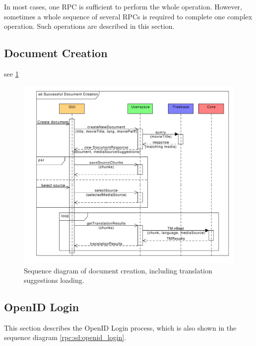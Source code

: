 In most cases, one RPC is sufficient to perform the whole operation. However, sometimes a whole sequence of several RPCs is required to complete one complex operation. Such operations are described in this section.

\subsection{Document Creation}

see \ref{rpc:sd:document_creation}



\begin{figure}[h]
\begin{center}
\includegraphics[scale=0.65]{figures/document_creation_sequence_RPC.pdf}
\end{center}
\caption{Sequence diagram of document creation, including translation suggestions loading.}\label{rpc:sd:document_creation}
\end{figure}

\subsection{OpenID Login}
\label{sec:OpenID_Login}

This section describes the OpenID Login process, which is also shown in the sequence diagram \ref{rpc:sd:openid_login}.


